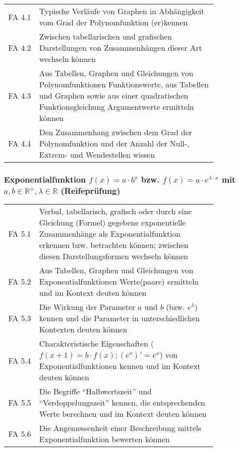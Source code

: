 \documentclass[a4paper,12pt]{article}
\begin{document}
\begin{tabular}{cp{0.85\linewidth}}
FA 4.1 & Typische Verläufe von Graphen in Abhängigkeit vom Grad der Polynomfunktion (er)kennen \\
FA 4.2 & Zwischen tabellarischen und grafischen Darstellungen von Zusammenhängen dieser Art wechseln können \\
FA 4.3 & Aus Tabellen, Graphen und Gleichungen von Polynomfunktionen Funktionswerte, aus Tabellen und Graphen sowie aus einer quadratischen Funktionsgleichung Argumentwerte ermitteln können\\
FA 4.4 & Den Zusammenhang zwischen dem Grad der Polynomfunktion und der Anzahl der Null-, Extrem- und Wendestellen wissen\\
\end{tabular}


\subsubsection{Exponentialfunktion $f(x)=a\cdot b^x$ bzw. $f(x)=a \cdot e^{\lambda \cdot x}$ mit $a,b \in \mathbb{R}^+, \lambda \in \mathbb{R}$ (Reifeprüfung)}

\begin{tabular}{cp{0.85\linewidth}}
FA 5.1 & Verbal, tabellarisch, grafisch oder durch eine Gleichung (Formel) gegebene exponentielle Zusammenhänge als Exponentialfunktion erkennen bzw. betrachten können; zwischen diesen Darstellungsformen wechseln können\\
FA 5.2 & Aus Tabellen, Graphen und Gleichungen von Exponentialfunktionen Werte(paare) ermitteln und im Kontext deuten können\\
FA 5.3 & Die Wirkung der Parameter $a$ und $b$ (bzw. $e^\lambda$) kennen und die Parameter in unterschiedlichen Kontexten deuten können\\
FA 5.4 & Charakteristische Eigenschaften ($f(x+1)=b\cdot f(x); (e^x)'=e^x$) von Exponentialfunktionen kennen und im Kontext deuten können \\
FA 5.5 & Die Begriffe "`Halbwertszeit"' und "`Verdoppelungszeit"' kennen, die entsprechenden Werte berechnen und im Kontext deuten können\\
FA 5.6 & Die Angemessenheit einer Beschreibung mittels Exponentialfunktion bewerten können \\
\end{tabular}
\end{document}
